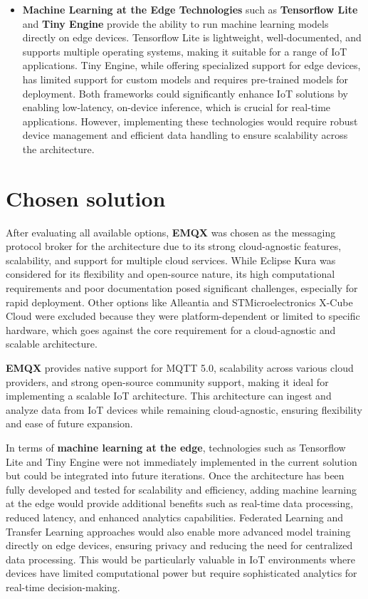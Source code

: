 \begin{itemize}
    \item \textbf{Machine Learning at the Edge Technologies} such as \textbf{Tensorflow Lite} and \textbf{Tiny Engine} provide the ability to run machine learning models directly on edge devices. Tensorflow Lite is lightweight, well-documented, and supports multiple operating systems, making it suitable for a range of IoT applications. Tiny Engine, while offering specialized support for edge devices, has limited support for custom models and requires pre-trained models for deployment. Both frameworks could significantly enhance IoT solutions by enabling low-latency, on-device inference, which is crucial for real-time applications. However, implementing these technologies would require robust device management and efficient data handling to ensure scalability across the architecture.
\end{itemize}

\section{Chosen solution}
\label{sec:chosen-solution}
After evaluating all available options, \textbf{EMQX} was chosen as the messaging protocol broker for the architecture due to its strong cloud-agnostic features, scalability, and support for multiple cloud services. While Eclipse Kura was considered for its flexibility and open-source nature, its high computational requirements and poor documentation posed significant challenges, especially for rapid deployment. Other options like Alleantia and STMicroelectronics X-Cube Cloud were excluded because they were platform-dependent or limited to specific hardware, which goes against the core requirement for a cloud-agnostic and scalable architecture.

\textbf{EMQX} provides native support for MQTT 5.0, scalability across various cloud providers, and strong open-source community support, making it ideal for implementing a scalable IoT architecture. This architecture can ingest and analyze data from IoT devices while remaining cloud-agnostic, ensuring flexibility and ease of future expansion.

In terms of \textbf{machine learning at the edge}, technologies such as Tensorflow Lite and Tiny Engine were not immediately implemented in the current solution but could be integrated into future iterations. Once the architecture has been fully developed and tested for scalability and efficiency, adding machine learning at the edge would provide additional benefits such as real-time data processing, reduced latency, and enhanced analytics capabilities. Federated Learning and Transfer Learning approaches would also enable more advanced model training directly on edge devices, ensuring privacy and reducing the need for centralized data processing. This would be particularly valuable in IoT environments where devices have limited computational power but require sophisticated analytics for real-time decision-making.
